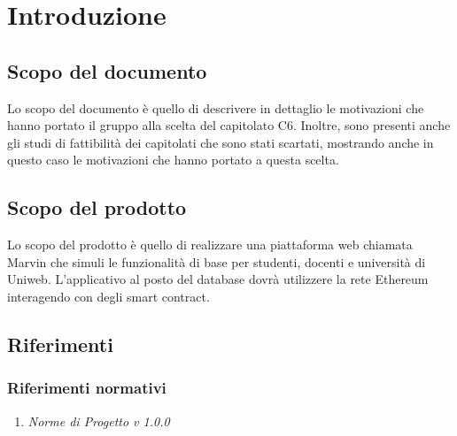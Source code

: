 \documentclass[StudioDiFattibilità.tex]{subfiles}
\begin{document}
\chapter{Introduzione}
\section{Scopo del documento}
Lo scopo del documento è quello di descrivere in dettaglio le motivazioni che hanno portato il gruppo alla scelta del capitolato C6. Inoltre, sono presenti anche gli studi di fattibilità dei capitolati che sono stati scartati, mostrando anche in questo caso le motivazioni che hanno portato a questa scelta.
\section{Scopo del prodotto}
Lo scopo del prodotto è quello di realizzare una piattaforma web chiamata Marvin che simuli le funzionalità di base per studenti, docenti e università di Uniweb. L'applicativo al posto del database dovrà utilizzere la rete Ethereum interagendo con degli smart contract.

\glossExpl

\section{Riferimenti}
\subsection{Riferimenti normativi}
\begin{enumerate}
	\item \textit{Norme di Progetto v 1.0.0}
\end{enumerate}
\end{document}
